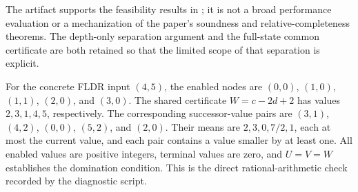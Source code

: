 The artifact supports the feasibility results in
; it is not a broad performance evaluation or a
mechanization of the paper's soundness and relative-completeness theorems.
The depth-only separation argument and the full-state common certificate are
both retained so that the limited scope of that separation is explicit.


For the concrete FLDR input $(4,5)$, the enabled nodes are $(0,0)$,
$(1,0)$, $(1,1)$, $(2,0)$, and $(3,0)$. The shared certificate
$W=c-2d+2$ has values $2,3,1,4,5$, respectively. The corresponding
successor-value pairs are $(3,1)$, $(4,2)$, $(0,0)$, $(5,2)$, and
$(2,0)$. Their means are $2,3,0,7/2,1$, each at most the current
value, and each pair contains a value smaller by at least one.
All enabled values are positive integers, terminal values are zero, and
$U=V=W$ establishes the domination condition. This is the direct
rational-arithmetic check recorded by the diagnostic script.
